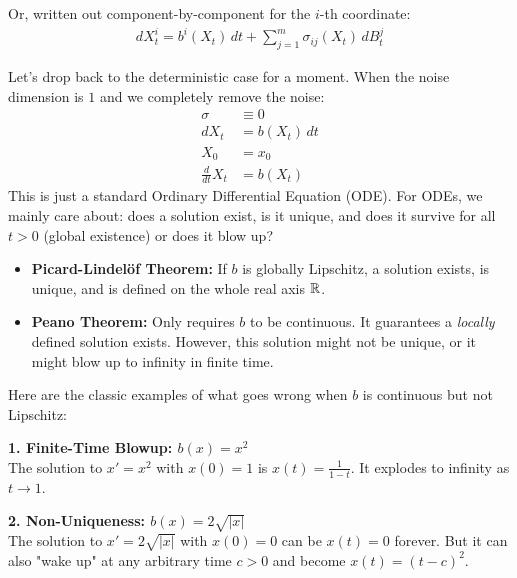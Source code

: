 Or, written out component-by-component for the $i$-th coordinate:
\begin{align*}
    dX_t^i = b^i(X_t) \, dt + \sum_{j=1}^m \sigma_{ij}(X_t) \, dB_t^j 
\end{align*}

Let's drop back to the deterministic case for a moment. When the noise dimension is $1$ and we completely remove the noise:
\begin{align*}
    \sigma &\equiv 0 \\
    dX_t &= b(X_t) \, dt \\
    X_0 &= x_0 \\
    \frac{d}{dt} X_t &= b(X_t)
\end{align*}
This is just a standard Ordinary Differential Equation (ODE). For ODEs, we mainly care about: does a solution exist, is it unique, and does it survive for all $t > 0$ (global existence) or does it blow up?

\begin{itemize}
    \item \textbf{Picard-Lindelöf Theorem:} If $b$ is globally Lipschitz, a solution exists, is unique, and is defined on the whole real axis $\mathbb{R}$.
    \item \textbf{Peano Theorem:} Only requires $b$ to be continuous. It guarantees a \textit{locally} defined solution exists. However, this solution might not be unique, or it might blow up to infinity in finite time.
\end{itemize}

Here are the classic examples of what goes wrong when $b$ is continuous but not Lipschitz:

\vspace{0.5em}
\noindent\textbf{1. Finite-Time Blowup: $b(x) = x^2$} \\
The solution to $x' = x^2$ with $x(0) = 1$ is $x(t) = \frac{1}{1-t}$. It explodes to infinity as $t \to 1$.

\noindent\textbf{2. Non-Uniqueness: $b(x) = 2\sqrt{|x|}$} \\
The solution to $x' = 2\sqrt{|x|}$ with $x(0) = 0$ can be $x(t) = 0$ forever. But it can also "wake up" at any arbitrary time $c > 0$ and become $x(t) = (t-c)^2$.

